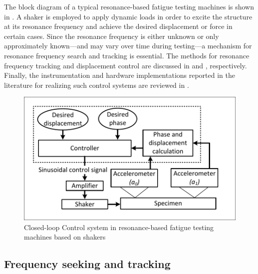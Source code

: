 \documentclass[preprint,12pt]{elsarticle}
\begin{document}
The block diagram of a typical resonance-based fatigue testing machines is shown in . A shaker is employed to apply dynamic loads in order to excite the structure at its resonance frequency and achieve the desired displacement or force in certain cases. Since the resonance frequency is either unknown or only approximately known—and may vary over time during testing—a mechanism for resonance frequency search and tracking is essential. The methods for resonance frequency tracking and displacement control are discussed in  and , respectively. Finally, the instrumentation and hardware implementations reported in the literature for realizing such control systems are reviewed in .
\begin{figure}
    \centering    \includegraphics[width=\linewidth]{Control_system_fatigue_total.pdf}
    \caption{Closed-loop Control system in resonance-based fatigue testing machines based on shakers}
    \label{F_control_diagram}
\end{figure}



\subsection{Frequency seeking and tracking}  \label{S_frequency_seeking}
\end{document}

